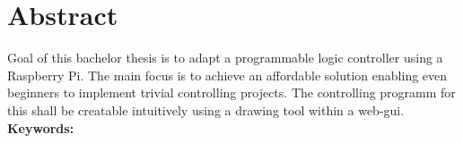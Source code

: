 \section*{Abstract}
\begin{quote}\textit{\TitelEn}\end{quote}
Goal of this bachelor thesis is to adapt a programmable logic controller using a Raspberry Pi. The main focus is to achieve an affordable solution enabling even beginners to implement trivial controlling projects. The controlling programm for this shall be creatable intuitively using a drawing tool within a web-gui.
\\[0.5cm]
\textbf{Keywords:} \keywordsEn
\newpage
